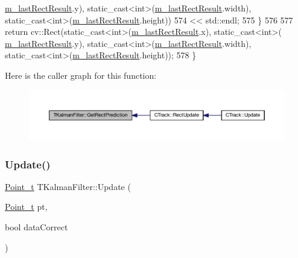 \begin{DoxyCode}
      \mbox{\hyperlink{class_t_kalman_filter_aed4818c7aac455928ef02dd03f8bfe56}{m\_lastRectResult}}.y), \textcolor{keyword}{static\_cast<}\textcolor{keywordtype}{int}\textcolor{keyword}{>}(\mbox{\hyperlink{class_t_kalman_filter_aed4818c7aac455928ef02dd03f8bfe56}{m\_lastRectResult}}.width), 
      static\_cast<int>(\mbox{\hyperlink{class_t_kalman_filter_aed4818c7aac455928ef02dd03f8bfe56}{m\_lastRectResult}}.height))
574             << std::endl;
575     \}
576 
577     \textcolor{keywordflow}{return} cv::Rect(static\_cast<int>(\mbox{\hyperlink{class_t_kalman_filter_aed4818c7aac455928ef02dd03f8bfe56}{m\_lastRectResult}}.x), static\_cast<int>(
      \mbox{\hyperlink{class_t_kalman_filter_aed4818c7aac455928ef02dd03f8bfe56}{m\_lastRectResult}}.y), static\_cast<int>(\mbox{\hyperlink{class_t_kalman_filter_aed4818c7aac455928ef02dd03f8bfe56}{m\_lastRectResult}}.width), 
      static\_cast<int>(\mbox{\hyperlink{class_t_kalman_filter_aed4818c7aac455928ef02dd03f8bfe56}{m\_lastRectResult}}.height));
578 \}
\end{DoxyCode}
Here is the caller graph for this function\+:\nopagebreak
\begin{figure}[H]
\begin{center}
\leavevmode
\includegraphics[width=350pt]{class_t_kalman_filter_af112feed15a064055987a1faedf9673d_icgraph}
\end{center}
\end{figure}
\mbox{\label{class_t_kalman_filter_a0c25b9a1a9676956aed0db44ad56696a}} 
\subsubsection{\texorpdfstring{Update()}{Update()}\hspace{0.1cm}{\footnotesize\ttfamily [1/2]}}
{\footnotesize\ttfamily \mbox{\hyperlink{defines_8h_a8c42696da8f098b91374a8e8bb84b430}{Point\+\_\+t}} T\+Kalman\+Filter\+::\+Update (\begin{DoxyParamCaption}\item[{\mbox{\hyperlink{defines_8h_a8c42696da8f098b91374a8e8bb84b430}{Point\+\_\+t}}}]{pt,  }\item[{bool}]{data\+Correct }\end{DoxyParamCaption})}



